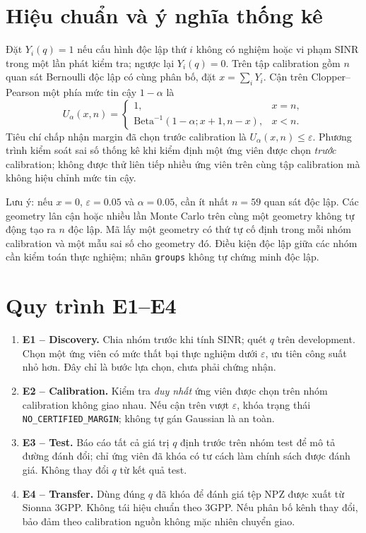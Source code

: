 \documentclass[11pt,onecolumn]{IEEEtran}
\begin{document}
\section{Hiệu chuẩn và ý nghĩa thống kê}
Đặt $Y_i(q)=1$ nếu cấu hình độc lập thứ $i$ không có nghiệm hoặc vi phạm SINR trong một lần phát kiểm tra; ngược lại $Y_i(q)=0$. Trên tập calibration gồm $n$ quan sát Bernoulli độc lập có cùng phân bố, đặt $x=\sum_iY_i$. Cận trên Clopper--Pearson một phía mức tin cậy $1-\alpha$ là
\begin{equation}
U_\alpha(x,n)=\begin{cases}1,&x=n,\\\mathrm{Beta}^{-1}(1-\alpha;x+1,n-x),&x<n.\end{cases}
\end{equation}
Tiêu chí chấp nhận margin đã chọn trước calibration là $U_\alpha(x,n)\le\varepsilon$. Phương trình kiểm soát sai số thống kê khi kiểm định một ứng viên được chọn \emph{trước} calibration; không được thử liên tiếp nhiều ứng viên trên cùng tập calibration mà không hiệu chỉnh mức tin cậy.

Lưu ý: nếu $x=0$, $\varepsilon=0.05$ và $\alpha=0.05$, cần ít nhất $n=59$ quan sát độc lập. Các geometry lân cận hoặc nhiều lần Monte Carlo trên cùng một geometry không tự động tạo ra $n$ độc lập. Mã lấy một geometry có thứ tự cố định trong mỗi nhóm calibration và một mẫu sai số cho geometry đó. Điều kiện độc lập giữa các nhóm cần kiểm toán thực nghiệm; nhãn \texttt{groups} không tự chứng minh độc lập.

\section{Quy trình E1--E4}
\begin{enumerate}[leftmargin=*]
\item \textbf{E1 -- Discovery.} Chia nhóm trước khi tính SINR; quét $q$ trên development. Chọn một ứng viên có mức thất bại thực nghiệm dưới $\varepsilon$, ưu tiên công suất nhỏ hơn. Đây chỉ là bước lựa chọn, chưa phải chứng nhận.
\item \textbf{E2 -- Calibration.} Kiểm tra \emph{duy nhất} ứng viên được chọn trên nhóm calibration không giao nhau. Nếu cận trên vượt $\varepsilon$, khóa trạng thái \texttt{NO\_CERTIFIED\_MARGIN}; không tự gán Gaussian là an toàn.
\item \textbf{E3 -- Test.} Báo cáo tất cả giá trị $q$ định trước trên nhóm test để mô tả đường đánh đổi; chỉ ứng viên đã khóa có tư cách làm chính sách được đánh giá. Không thay đổi $q$ từ kết quả test.
\item \textbf{E4 -- Transfer.} Dùng đúng $q$ đã khóa để đánh giá tệp NPZ được xuất từ Sionna 3GPP. Không tái hiệu chuẩn theo 3GPP. Nếu phân bố kênh thay đổi, bảo đảm theo calibration nguồn không mặc nhiên chuyển giao.
\end{enumerate}
\end{document}
